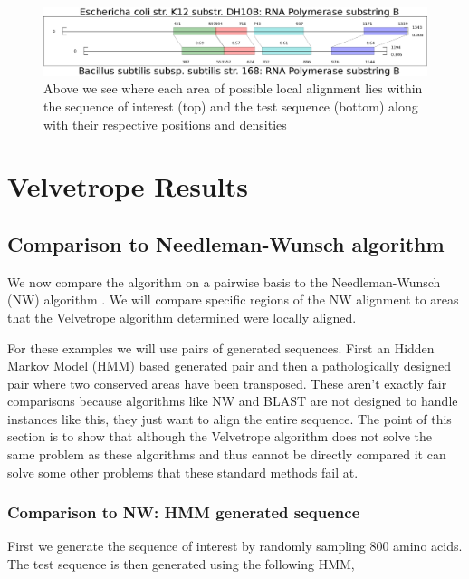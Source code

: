 \documentclass[phd,tocprelim]{cornell}
\begin{document}
 \begin{figure}[htp]%
 \centerline{\includegraphics[width=\textwidth]{figures/velvetrope/localAlignmentsBreakout.png}}
 \caption[Local alignments]{Above we see where each area of possible local alignment lies within the sequence of interest (top) and the test sequence (bottom) along with their respective positions and densities}
 	\label{fig:vr03}
 \end{figure}


\chapter{Velvetrope Results} %
\label{cha:Velvetrope Results}

\section{Comparison to Needleman-Wunsch algorithm}

We now compare the algorithm on a pairwise basis to the Needleman-Wunsch (NW) algorithm \cite{Durbin06}. We will compare specific regions of the NW alignment to areas that the Velvetrope algorithm determined were locally aligned.

For these examples we will use pairs of generated sequences. First an Hidden Markov Model (HMM) based generated pair and then a pathologically designed pair where two conserved areas have been transposed. These aren't exactly fair comparisons because algorithms like NW and BLAST are not designed to handle instances like this, they just want to align the entire sequence. The point of this section is to show that although the Velvetrope algorithm does not solve the same problem as these algorithms and thus cannot be directly compared it can solve some other problems that these standard methods fail at.

\subsection{Comparison to NW: HMM generated sequence}

First we generate the sequence of interest by randomly sampling 800 amino acids. The test sequence is then generated using the following HMM,
\end{document}
